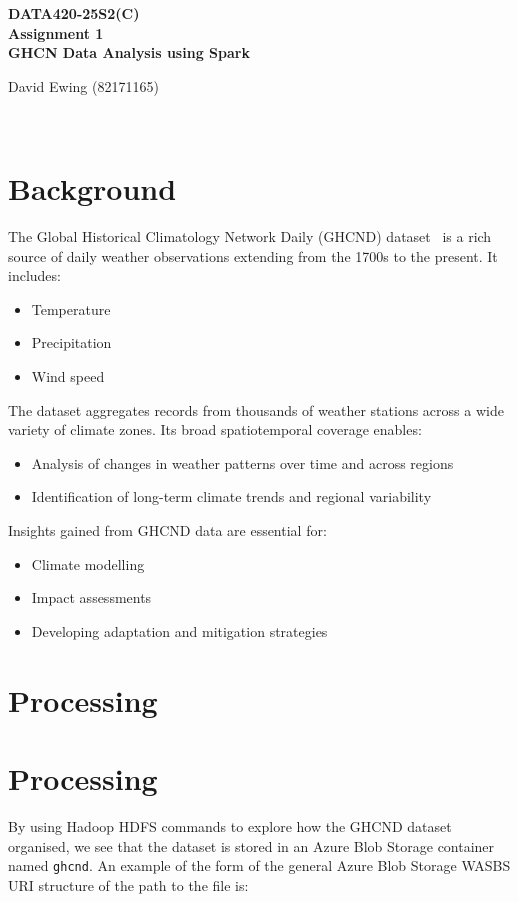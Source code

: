 \documentclass[11pt]{article}
\newcommand{\customtitle}{
    \begin{center}
        \vspace*{3cm}
        
        {\Large\textsf{\textbf{DATA420-25S2(C)}}}\\
        \vspace{0.3cm} 
        {\large\textsf{\textbf{Assignment 1}}}\\
        \vspace{5cm}
        {\Large\textsf{\textbf{GHCN Data Analysis using Spark}}}\\
        \vfill
        {\large David Ewing (82171165)\par}
        \vspace{0.3cm}
        \DTMsetdatestyle{iso}
        {\large\textsf{ \DTMnow}}\\
        
        \vspace{3cm}
    \end{center}
    \thispagestyle{empty}
}
\begin{document}
\renewcommand{\familydefault}{\sfdefault}
\customtitle
\renewcommand{\familydefault}{\sfdefault}
\newpage 



\section{Background}

The Global Historical Climatology Network Daily (GHCND) dataset~\cite{ncei2024} is a rich source of daily weather observations extending from the 1700s to the present. It includes:

\begin{itemize}
    \item Temperature
    \item Precipitation
    \item Wind speed
\end{itemize}

The dataset aggregates records from thousands of weather stations across a wide variety of climate zones. Its broad spatiotemporal coverage enables:

\begin{itemize}
    \item Analysis of changes in weather patterns over time and across regions
    \item Identification of long-term climate trends and regional variability
\end{itemize}

Insights gained from GHCND data are essential for:

\begin{itemize}
    \item Climate modelling
    \item Impact assessments
    \item Developing adaptation and mitigation strategies
\end{itemize}\section{Processing}

\section{Processing} 


By using Hadoop HDFS commands to explore how the GHCND dataset organised, we see that the dataset is stored in an Azure Blob Storage container named \texttt{ghcnd}. An example of the form of the general Azure Blob Storage WASBS URI structure of the path to the file is:
\end{document}
